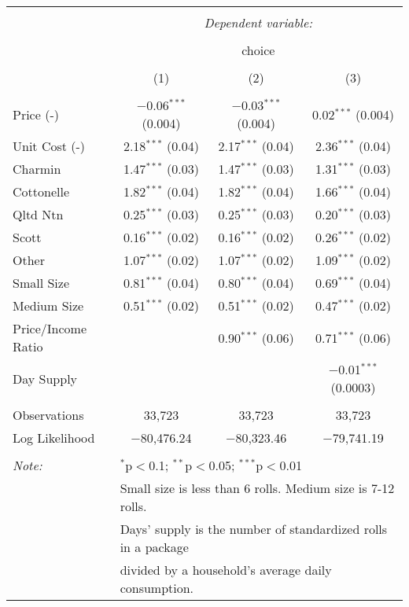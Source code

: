 
\begin{table}[!htbp] \centering 
  \caption{} 
  \label{tab:mnlBostonBaseline} 
\begin{tabular}{@{\extracolsep{5pt}}lccc} 
\\[-1.8ex]\hline 
\hline \\[-1.8ex] 
 & \multicolumn{3}{c}{\textit{Dependent variable:}} \\ 
\cline{2-4} 
\\[-1.8ex] & \multicolumn{3}{c}{choice} \\ 
\\[-1.8ex] & (1) & (2) & (3)\\ 
\hline \\[-1.8ex] 
 Price (-) & $-$0.06$^{***}$ (0.004) & $-$0.03$^{***}$ (0.004) & 0.02$^{***}$ (0.004) \\ 
  Unit Cost (-) & 2.18$^{***}$ (0.04) & 2.17$^{***}$ (0.04) & 2.36$^{***}$ (0.04) \\ 
  Charmin & 1.47$^{***}$ (0.03) & 1.47$^{***}$ (0.03) & 1.31$^{***}$ (0.03) \\ 
  Cottonelle & 1.82$^{***}$ (0.04) & 1.82$^{***}$ (0.04) & 1.66$^{***}$ (0.04) \\ 
  Qltd Ntn & 0.25$^{***}$ (0.03) & 0.25$^{***}$ (0.03) & 0.20$^{***}$ (0.03) \\ 
  Scott & 0.16$^{***}$ (0.02) & 0.16$^{***}$ (0.02) & 0.26$^{***}$ (0.02) \\ 
  Other & 1.07$^{***}$ (0.02) & 1.07$^{***}$ (0.02) & 1.09$^{***}$ (0.02) \\ 
  Small Size & 0.81$^{***}$ (0.04) & 0.80$^{***}$ (0.04) & 0.69$^{***}$ (0.04) \\ 
  Medium Size & 0.51$^{***}$ (0.02) & 0.51$^{***}$ (0.02) & 0.47$^{***}$ (0.02) \\ 
  Price/Income Ratio &  & 0.90$^{***}$ (0.06) & 0.71$^{***}$ (0.06) \\ 
  Day Supply &  &  & $-$0.01$^{***}$ (0.0003) \\ 
 \hline \\[-1.8ex] 
Observations & 33,723 & 33,723 & 33,723 \\ 
Log Likelihood & $-$80,476.24 & $-$80,323.46 & $-$79,741.19 \\ 
\hline 
\hline \\[-1.8ex] 
\textit{Note:}  & \multicolumn{3}{l}{$^{*}$p$<$0.1; $^{**}$p$<$0.05; $^{***}$p$<$0.01} \\ 
 & \multicolumn{3}{l}{Small size is less than 6 rolls. Medium size is 7-12 rolls. } \\ 
 & \multicolumn{3}{l}{Days' supply is the number of standardized rolls in a package} \\ 
 & \multicolumn{3}{l}{divided by a household's average daily consumption.} \\ 
\end{tabular} 
\end{table} 
